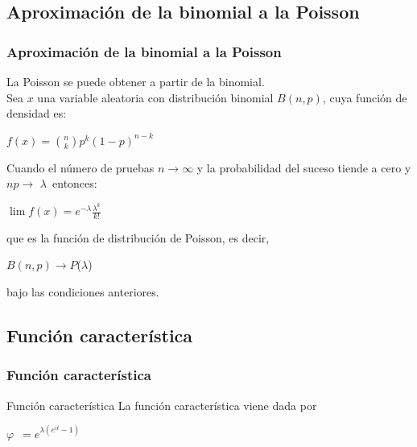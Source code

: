 \documentclass{beamer}
\newcommand{\LAl}{{\lambda}}
\newcommand{\LA}{{$\lambda$}}
\newcommand{\PHI}{{$\varphi$}}
\begin{document}
\subsection {Aproximación de la binomial a la Poisson}
\begin{frame}
\frametitle{Aproximación de la binomial a la Poisson}

La Poisson se puede obtener a partir de la binomial.\\
Sea $x$ una variable aleatoria con distribución binomial $B(n,p)$, cuya función de densidad es:
\centerline{$f(x)={n\choose k}p^k(1-p)^{n-k}$} 
Cuando el número de pruebas $n \rightarrow \infty$ y la probabilidad del suceso tiende a cero y $np \rightarrow$ \LA \ entonces:

\centerline{$\displaystyle\lim f(x)=e^{-\LAl}\frac{\LAl^{k}}{k!}$} 

que es la función de distribución de Poisson, es decir,\\
\centerline{$B(n,p)\rightarrow P$(\LA)} 
bajo las condiciones anteriores.
\end{frame}

\subsection{Función característica}
\begin{frame}
\frametitle{Función característica}
\begin{block}{Función característica}
La función característica viene dada por

\centerline {\PHI \ $ = e^{\LAl(e^{it}-1)}$}
\end{block}

\end{frame}



\end{document}
